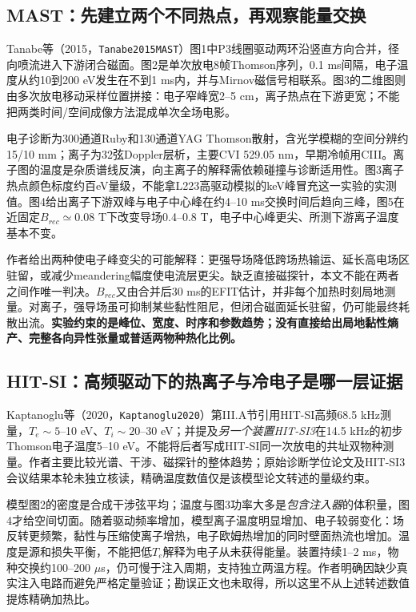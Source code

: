 \subsection{MAST：先建立两个不同热点，再观察能量交换}
Tanabe等（2015，\texttt{Tanabe2015MAST}）图1中P3线圈驱动两环沿竖直方向合并，径向喷流进入下游闭合磁面。图2是单次放电8帧Thomson序列，0.1 ms间隔，电子温度从约10到200 eV发生在不到1 ms内，并与Mirnov磁信号相联系。图3的二维图则由多次放电移动采样位置拼接：电子窄峰宽2--5 cm，离子热点在下游更宽；不能把两类时间/空间成像方法混成单次全场电影。\citep{Tanabe2015MAST}

电子诊断为300通道Ruby和130通道YAG Thomson散射，含光学模糊的空间分辨约15/10 mm；离子为32弦Doppler层析，主要CVI 529.05 nm，早期冷帧用CIII。离子图的温度是杂质谱线反演，向主离子的解释需依赖碰撞与诊断适用性。图3离子热点颜色标度约百eV量级，不能拿L223高驱动模拟的keV峰冒充这一实验的实测值。图4给出离子下游双峰与电子中心峰在约4--10 ms交换时间后趋向三峰，图5在近固定$B_{rec}\simeq0.08$ T下改变导场0.4--0.8 T，电子中心峰更尖、所测下游离子温度基本不变。

作者给出两种使电子峰变尖的可能解释：更强导场降低跨场热输运、延长高电场区驻留，或减少meandering幅度使电流层更尖。缺乏直接磁探针，本文不能在两者之间作唯一判决。$B_{rec}$又由合并后30 ms的EFIT估计，并非每个加热时刻局地测量。对离子，强导场虽可抑制某些黏性阻尼，但闭合磁面延长驻留，仍可能最终耗散出流。\textbf{实验约束的是峰位、宽度、时序和参数趋势；没有直接给出局地黏性熵产、完整各向异性张量或普适两物种热化比例。}


\subsection{HIT-SI：高频驱动下的热离子与冷电子是哪一层证据}
Kaptanoglu等（2020，\texttt{Kaptanoglu2020}）第III.A节引用HIT-SI高频68.5 kHz测量，$T_e\sim5$--10 eV、$T_i\sim20$--30 eV；并提及\emph{另一个装置HIT-SI3}在14.5 kHz的初步Thomson电子温度5--10 eV。不能将后者写成HIT-SI同一次放电的共址双物种测量。作者主要比较光谱、干涉、磁探针的整体趋势；原始诊断学位论文及HIT-SI3会议结果本轮未独立核读，精确温度数值仅是该模型论文转述的量级约束。\citep{Kaptanoglu2020}

模型图2的密度是合成干涉弦平均；温度与图3功率大多是\emph{包含注入器}的体积量，图4才给空间切面。随着驱动频率增加，模型离子温度明显增加、电子较弱变化：场反转更频繁，黏性与压缩使离子增热，电子欧姆热增加的同时壁面热流也增加。温度是源和损失平衡，不能把低$T_e$解释为电子从未获得能量。装置持续1--2 ms，物种交换约100--200 $\mu$s，仍可慢于注入周期，支持独立两温方程。作者明确因缺少真实注入电路而避免严格定量验证；勘误正文也未取得，所以这里不从上述转述数值提炼精确加热比。

